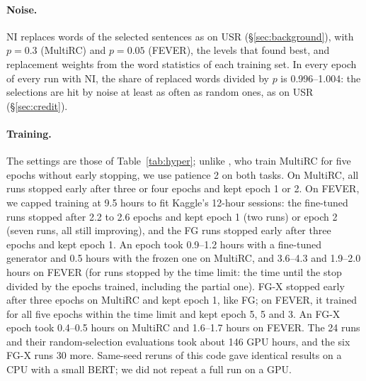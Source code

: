 \documentclass[11pt]{article}
\begin{document}
\paragraph{Noise.} NI replaces words of the selected sentences as on USR (\S\ref{sec:background}), with $p = 0.3$ (MultiRC) and $p = 0.05$ (FEVER), the levels that \citet{storek-etal-2023-unsupervised} found best, and replacement weights from the word statistics of each training set. In every epoch of every run with NI, the share of replaced words divided by $p$ is 0.996--1.004: the selections are hit by noise at least as often as random ones, as on USR (\S\ref{sec:credit}).

\paragraph{Training.} The settings are those of Table~\ref{tab:hyper}; unlike \citet{storek-etal-2023-unsupervised}, who train MultiRC for five epochs without early stopping, we use patience 2 on both tasks. On MultiRC, all runs stopped early after three or four epochs and kept epoch 1 or 2. On FEVER, we capped training at 9.5 hours to fit Kaggle's 12-hour sessions: the fine-tuned runs stopped after 2.2 to 2.6 epochs and kept epoch 1 (two runs) or epoch 2 (seven runs, all still improving), and the FG runs stopped early after three epochs and kept epoch 1. An epoch took 0.9--1.2 hours with a fine-tuned generator and 0.5 hours with the frozen one on MultiRC, and 3.6--4.3 and 1.9--2.0 hours on FEVER (for runs stopped by the time limit: the time until the stop divided by the epochs trained, including the partial one). FG-X stopped early after three epochs on MultiRC and kept epoch 1, like FG; on FEVER, it trained for all five epochs within the time limit and kept epoch 5, 5 and 3. An FG-X epoch took 0.4--0.5 hours on MultiRC and 1.6--1.7 hours on FEVER. The 24 runs and their random-selection evaluations took about 146 GPU hours, and the six FG-X runs 30 more. Same-seed reruns of this code gave identical results on a CPU with a small BERT; we did not repeat a full run on a GPU.
\end{document}
